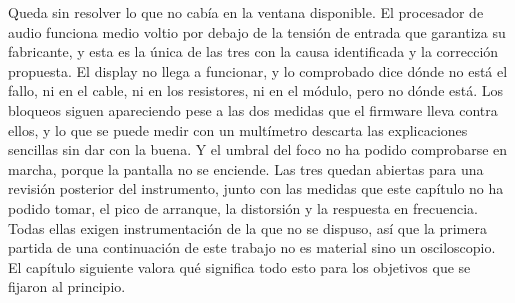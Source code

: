 Queda sin resolver lo que no cabía en la ventana disponible. El procesador de
audio funciona medio voltio por debajo de la tensión de entrada que garantiza
su fabricante, y esta es la única de las tres con la causa identificada y la
corrección propuesta. El display no llega a funcionar, y lo comprobado dice
dónde no está el fallo, ni en el cable, ni en los resistores, ni en el módulo,
pero no dónde está. Los bloqueos siguen apareciendo pese a las dos medidas que
el firmware lleva contra ellos, y lo que se puede medir con un multímetro
descarta las explicaciones sencillas sin dar con la buena. Y el umbral del foco
no ha podido comprobarse en marcha, porque la pantalla no se enciende. Las
tres quedan abiertas para una revisión posterior del instrumento, junto con
las medidas que este capítulo no ha podido tomar, el pico de arranque, la
distorsión y la respuesta en frecuencia. Todas ellas exigen instrumentación de
la que no se dispuso, así que la primera partida de una continuación de este
trabajo no es material sino un osciloscopio. El
capítulo siguiente valora qué significa todo esto para los objetivos que se
fijaron al principio.
